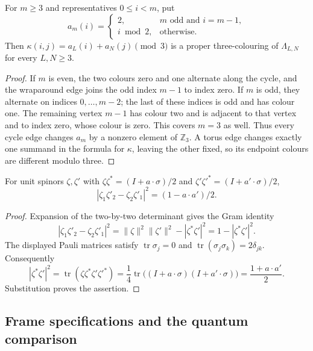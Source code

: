 \begin{lemma}\label{l:colour}
For \(m\ge3\) and representatives \(0\le i<m\), put
\[
 a_m(i)=\begin{cases}2,&m\text{ odd and }i=m-1,\\i\bmod2,&\text{otherwise}.
 \end{cases}
\]
Then \(\kappa(i,j)=a_L(i)+a_N(j)\pmod3\) is a proper
three-colouring of \(\Lambda_{L,N}\) for every \(L,N\ge3\).
\end{lemma}

\begin{proof}
If \(m\) is even, the two colours zero and one alternate along
the cycle, and the wraparound edge joins the odd index \(m-1\)
to index zero. If \(m\) is odd, they alternate on indices
\(0,\ldots,m-2\); the last of these indices is odd and has
colour one. The remaining vertex \(m-1\) has colour two and is
adjacent to that vertex and to index zero, whose colour is zero.
This covers \(m=3\) as well. Thus every cycle edge changes
\(a_m\) by a nonzero element of \(\mathbb Z_3\).
A torus edge changes exactly one summand in the formula for
\(\kappa\), leaving the other fixed, so its endpoint colours
are different modulo three.
\end{proof}

\begin{lemma}\label{l:qmod}
For unit spinors \(\zeta,\zeta'\) with
\(\zeta\zeta^*=(I+a\cdot\sigma)/2\) and
\(\zeta'\zeta'^*=(I+a'\cdot\sigma)/2\),
\[
 |\zeta_1\zeta'_2-\zeta_2\zeta'_1|^2=(1-a\cdot a')/2 .
\]
\end{lemma}

\begin{proof}
Expansion of the two-by-two determinant gives the Gram identity
\[
 |\zeta_1\zeta'_2-\zeta_2\zeta'_1|^2
       =\|\zeta\|^2\|\zeta'\|^2-|\zeta^*\zeta'|^2
       =1-|\zeta^*\zeta'|^2.
\]
The displayed Pauli matrices satisfy
\(\operatorname{tr}\sigma_j=0\) and
\(\operatorname{tr}(\sigma_j\sigma_k)=2\delta_{jk}\).
Consequently
\[
 |\zeta^*\zeta'|^2
 =\operatorname{tr}(\zeta\zeta^*\zeta'\zeta'^*)
 =\frac14\operatorname{tr}\bigl((I+a\cdot\sigma)
                               (I+a'\cdot\sigma)\bigr)
 =\frac{1+a\cdot a'}2.
\]
Substitution proves the assertion.
\end{proof}

\subsection{Frame specifications and the quantum comparison}


